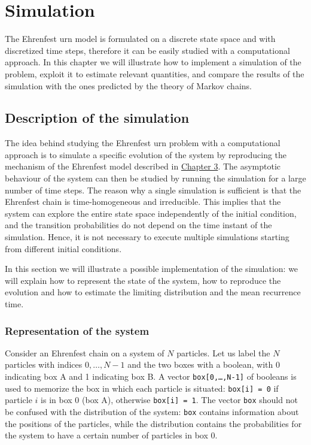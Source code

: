 \chapter{Simulation}
The Ehrenfest urn model is formulated on a discrete state space and with discretized time steps, therefore it can be easily studied with a computational approach. In this chapter we will illustrate how to implement a simulation of the problem, exploit it to estimate relevant quantities, and compare the results of the simulation with the ones predicted by the theory of Markov chains.

\section{Description of the simulation}
The idea behind studying the Ehrenfest urn problem with a computational approach is to simulate a specific evolution of the system by reproducing the mechanism of the Ehrenfest model described in \hyperref[ch:3]{Chapter 3}. The asymptotic behaviour of the system can then be studied by running the simulation for a large number of time steps. The reason why a single simulation is sufficient is that the Ehrenfest chain is time-homogeneous and irreducible. This implies that the system can explore the entire state space independently of the initial condition, and the transition probabilities do not depend on the time instant of the simulation. Hence, it is not necessary to execute multiple simulations starting from different initial conditions.

In this section we will illustrate a possible implementation of the simulation: we will explain how to represent the state of the system, how to reproduce the evolution and how to estimate the limiting distribution and the mean recurrence time.

\subsection{Representation of the system}
Consider an Ehrenfest chain on a system of $N$ particles. Let us label the $N$ particles with indices $0, \dots,N-1$ and the two boxes with a boolean, with 0 indicating box A and 1 indicating box B. A vector \texttt{box[0,\dots,N-1]} of booleans is used to memorize the box in which each particle is situated: \texttt{box[i] = 0} if particle $i$ is in box 0 (\ie box A), otherwise \texttt{box[i] = 1}. The vector \texttt{box} should not be confused with the distribution of the system: \texttt{box} contains information about the positions of the particles, while the distribution contains the probabilities for the system to have a certain number of particles in box 0.

